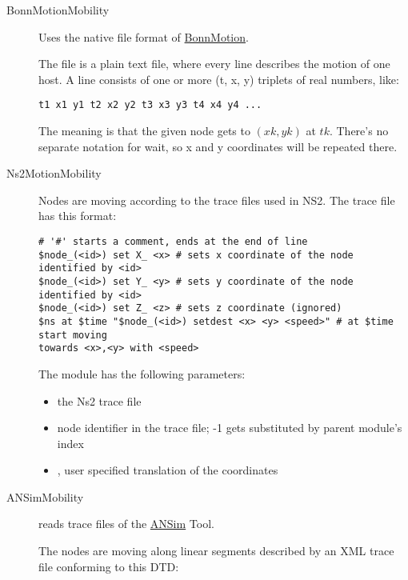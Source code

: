 \begin{description}

\item[BonnMotionMobility] Uses the native file format of
\href{http://bonnmotion.net}{BonnMotion}.

The file is a plain text file, where every line describes the motion
of one host. A line consists of one or more (t, x, y) triplets of real
numbers, like:

\begin{verbatim}
t1 x1 y1 t2 x2 y2 t3 x3 y3 t4 x4 y4 ...
\end{verbatim}

The meaning is that the given node gets to $(xk,yk)$ at $tk$. There's no
separate notation for wait, so x and y coordinates will be repeated there.

\item[Ns2MotionMobility] Nodes are moving according to the trace files used
in NS2. The trace file has this format:

\begin{verbatim}
# '#' starts a comment, ends at the end of line
$node_(<id>) set X_ <x> # sets x coordinate of the node identified by <id>
$node_(<id>) set Y_ <y> # sets y coordinate of the node identified by <id>
$node_(<id>) set Z_ <z> # sets z coordinate (ignored)
$ns at $time "$node_(<id>) setdest <x> <y> <speed>" # at $time start moving
towards <x>,<y> with <speed>
\end{verbatim}

The  module has the following parameters:

\begin{itemize}
  \item {} the Ns2 trace file
  \item {} node identifier in the trace file; -1 gets substituted by
  parent module's index
  \item {}, user specified translation of the
  coordinates
\end{itemize}


\item[ANSimMobility] reads trace files of the \href{http://www.ansim.info}{ANSim} Tool.

The nodes are moving along linear segments described by an XML trace file
conforming to this DTD:


\end{description}
